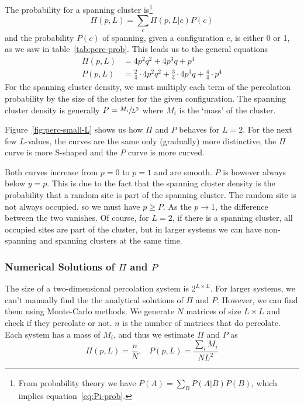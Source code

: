 \documentclass[11pt]{article}
\numberwithin{equation}{section}
\numberwithin{figure}{section}
\begin{document}
The probability for a spanning cluster is\footnote{From probability
    theory we have $P(A) = \sum_B P(A|B)P(B)$, which implies 
    equation~\ref{eq:Pi-prob}.}
\begin{equation}
    \Pi(p,L) = \sum_c \Pi(p,L|c)P(c) 
    \label{eq:Pi-prob}
\end{equation}
and the probability $P(c)$ of spanning, given a configuration $c$,
is either 0 or 1, as we saw in table~\ref{tab:perc-prob}.
This leads us to the general equations
\begin{align}
    \Pi(p,L) &= 4p^2q^2 + 4p^3q + p^4\\
    P(p,L) &= 
    \frac{2}{4}\cdot 4p^2q^2 + \frac{3}{4}\cdot 4p^3q + \frac{4}{4}\cdot p^4
\end{align}
For the spanning cluster density, we must multiply each term of the
percolation probability by the size of the cluster for the given
configuration. The spanning cluster density is generally
$P = \sfrac{M_i}{L^2}$ where $M_i$ is the `mass' of the cluster.

Figure~\ref{fig:perc-small-L} shows us how $\Pi$ and $P$ behaves
for $L=2$. For the next few $L$-values, the curves are the same
only (gradually) more distinctive, the $\Pi$ curve is more S-shaped and
the $P$ curve is more curved.

Both curves increase from $p=0$ to $p=1$ and are smooth.
$P$ is however always below $y=p$. This is due to the fact that
the spanning cluster density is the probability that a random site
is part of the spanning cluster. The random site is not
always occupied, so we must have $p \geq P$. As the $p\rightarrow 1$,
the difference between the two vanishes.
Of course, for $L=2$, if there is a spanning cluster, all
occupied sites are part of the cluster, but in larger
systems we can have non-spanning and spanning clusters at the same time.


\subsubsection{Numerical Solutions of $\Pi$ and $P$}
The size of a two-dimensional percolation system is $2^{L\times L}$.
For larger systems, we can't manually find the
the analytical solutions of $\Pi$ and $P$.
However, we can find them using Monte-Carlo methods.
We generate $N$ matrices of size $L\times L$ and
check if they percolate or not. $n$ is the number of
matrices that do percolate. Each system has a mass of $M_i$,
and thus we estimate $\Pi$ and $P$ as
\begin{equation}
    \Pi(p,L) = \frac{n}{N},\;\;\; P(p,L) = \frac{\sum_i M_i}{NL^2}
\end{equation}
\end{document}

